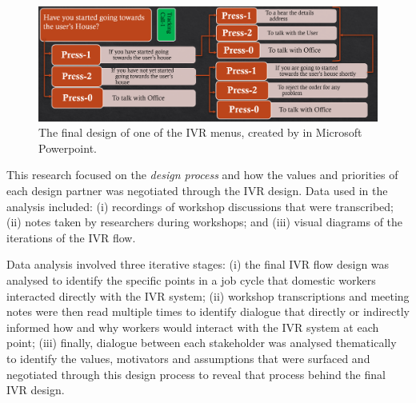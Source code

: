 \begin{figure}[h]
  \centering
  \includegraphics[width=1\linewidth]{images/ivrflow.png}
  \caption{The final design of one of the IVR menus, created by \PC{} in Microsoft Powerpoint.}\label{fig:ivrFlow}
  \Description{}
\end{figure}

This research focused on the \textit{design process} and how the values and priorities of each design partner was negotiated through the IVR design.  Data used in the analysis included: (i) recordings of workshop discussions that were transcribed; (ii) notes taken by researchers during workshops; and (iii) visual diagrams of the iterations of the IVR flow. 

Data analysis involved three iterative stages: (i) the final IVR flow design was analysed to identify the specific points in a job cycle that domestic workers interacted directly with the IVR system; (ii) workshop transcriptions and meeting notes were then read multiple times to identify dialogue that directly or indirectly informed how and why workers would interact with the IVR system at each point; (iii) finally, dialogue between each stakeholder was analysed thematically to identify the values, motivators and assumptions that were surfaced and negotiated through this design process to reveal that process behind the final IVR design. 
